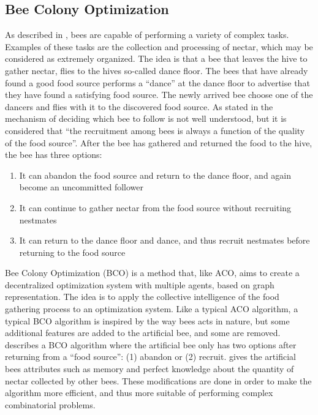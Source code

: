 
\subsection{Bee Colony Optimization}
\label{subsec:BCO}
As described in \citet{lucic03}, bees are capable of performing a variety of complex tasks. Examples of these tasks are the collection and processing of nectar, which may be considered as extremely organized. The idea is that a bee that leaves the hive to gather nectar, flies to the hives so-called dance floor. The bees that have already found a good food source performs a ``dance'' at the dance floor to advertise that they have found a satisfying food source. The newly arrived bee choose one of the dancers and flies with it to the discovered food source. As stated in \citet{lucic03} the mechanism of deciding which bee to follow is not well understood, but it is considered that ``the recruitment among bees is always a function of the quality of the food source''. After the bee has gathered and returned the food to the hive, the bee has three options\citep{lucic03}:

\begin{enumerate}
  \item It can abandon the food source and return to the dance floor, and again become an uncommitted follower
  \item It can continue to gather nectar from the food source without recruiting nestmates
  \item It can return to the dance floor and dance, and thus recruit nestmates before returning to the food source
\end{enumerate}

Bee Colony Optimization (BCO) is a method that, like ACO, aims to create a decentralized optimization system with multiple agents, based on graph representation. The idea is to apply the collective intelligence of the food gathering process to an optimization system. Like a typical ACO algorithm, a typical BCO algorithm is inspired by the way bees acts in nature, but some additional features are added to the artificial bee, and some are removed. \citet{nikolic14} describes a BCO algorithm where the artificial bee only has two options after returning from a ``food source'': (1) abandon or (2) recruit. \citet{lucic03} gives the artificial bees attributes such as memory and perfect knowledge about the quantity of nectar collected by other bees. These modifications are done in order to make the algorithm more efficient, and thus more suitable of performing complex combinatorial problems.

